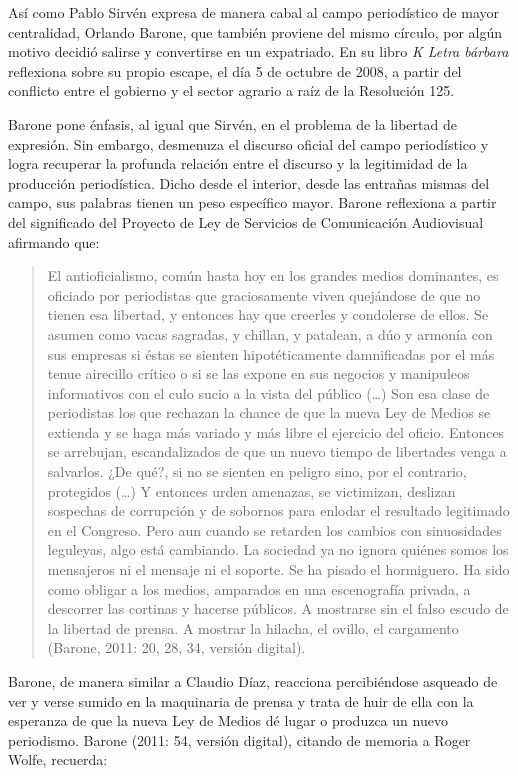 Así como Pablo Sirvén expresa de manera cabal al campo periodístico de mayor centralidad, Orlando Barone, que también proviene del mismo círculo, por algún motivo decidió salirse y convertirse en un expatriado. En su libro \emph{K Letra bárbara} reflexiona sobre su propio escape, el día 5 de octubre de 2008, a partir del conflicto entre el gobierno y el sector agrario a raíz de la Resolución 125.

Barone pone énfasis, al igual que Sirvén, en el problema de la libertad de expresión. Sin embargo, desmenuza el discurso oficial del campo periodístico y logra recuperar la profunda relación entre el discurso y la legitimidad de la producción periodística. Dicho desde el interior, desde las entrañas mismas del campo, sus palabras tienen un peso específico mayor. Barone reflexiona a partir del significado del Proyecto de Ley de Servicios de Comunicación Audiovisual afirmando que:

\begin{quote}
El antioficialismo, común hasta hoy en los grandes medios dominantes, es oficiado por periodistas que graciosamente viven quejándose de que no tienen esa libertad, y entonces hay que creerles y condolerse de ellos. Se asumen como vacas sagradas, y chillan, y patalean, a dúo y armonía con sus empresas si éstas se sienten hipotéticamente damnificadas por el más tenue airecillo crítico o si se las expone en sus negocios y manipuleos informativos con el culo sucio a la vista del público (\ldots) Son esa clase de periodistas los que rechazan la chance de que la nueva Ley de Medios se extienda y se haga más variado y más libre el ejercicio del oficio. Entonces se arrebujan, escandalizados de que un nuevo tiempo de libertades venga a salvarlos. ¿De qué?, si no se sienten en peligro sino, por el contrario, protegidos (\ldots) Y entonces urden amenazas, se victimizan, deslizan sospechas de corrupción y de sobornos para enlodar el resultado legitimado en el Congreso. Pero aun cuando se retarden los cambios con sinuosidades leguleyas, algo está cambiando. La sociedad ya no ignora quiénes somos los mensajeros ni el mensaje ni el soporte. Se ha pisado el hormiguero. Ha sido como obligar a los medios, amparados en una escenografía privada, a descorrer las cortinas y hacerse públicos. A mostrarse sin el falso escudo de la libertad de prensa. A mostrar la hilacha, el ovillo, el cargamento (Barone, 2011: 20, 28, 34, versión digital).
\end{quote}

Barone, de manera similar a Claudio Díaz, reacciona percibiéndose asqueado de ver y verse sumido en la maquinaria de prensa y trata de huir de ella con la esperanza de que la nueva Ley de Medios dé lugar o produzca un nuevo periodismo. Barone (2011: 54, versión digital), citando de memoria a Roger Wolfe, recuerda:

